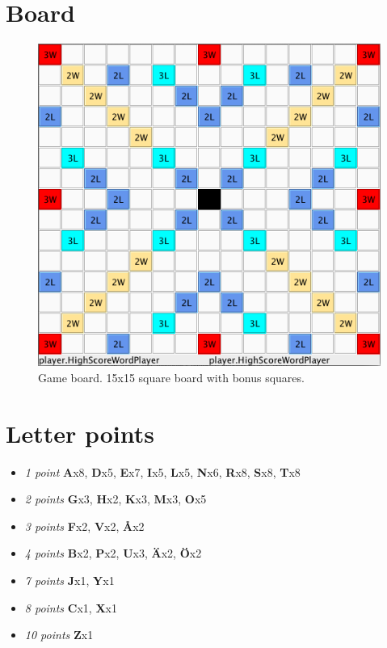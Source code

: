\documentclass[a4paper, 12pt]{report}
\begin{document}
\section{Board}
\label{sec:board}
\begin{figure}[h]
\centering
\includegraphics[scale=0.5]{board}
\caption {Game board. 15x15 square board with bonus squares.}
\label{fig:largeDict}
\end{figure}

\section{Letter points}
\label{sec:letterpoints}
\begin{itemize}
	\item{\emph{1 point}} \textbf{A}x8, \textbf{D}x5, \textbf{E}x7, \textbf{I}x5, \textbf{L}x5, \textbf{N}x6, \textbf{R}x8, \textbf{S}x8, \textbf{T}x8
	\item{\emph{2 points}} \textbf{G}x3, \textbf{H}x2, \textbf{K}x3, \textbf{M}x3, \textbf{O}x5
	\item{\emph{3 points}} \textbf{F}x2, \textbf{V}x2, \textbf{Å}x2
	\item{\emph{4 points}} \textbf{B}x2, \textbf{P}x2, \textbf{U}x3, \textbf{Ä}x2, \textbf{Ö}x2
	\item{\emph{7 points}} \textbf{J}x1, \textbf{Y}x1
	\item{\emph{8 points}} \textbf{C}x1, \textbf{X}x1
	\item{\emph{10 points}} \textbf{Z}x1
\end{itemize}
\end{document}

